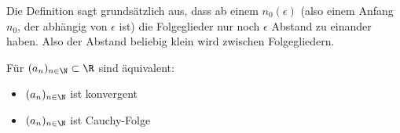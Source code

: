 Die Definition sagt grundsätzlich aus, dass ab einem $n_0(\epsilon)$ (also einem Anfang $n_0$, der abhängig von $\epsilon$ ist)
die Folgeglieder nur noch $\epsilon$ Abstand zu einander haben. Also der Abstand beliebig klein wird zwischen Folgegliedern.

\begin{satz}
Für $(a_n)_{n \in \N} \subset \R$ sind äquivalent:
\begin{itemize}
	\item $(a_n)_{n \in \N}$ ist konvergent
	\item $(a_n)_{n \in \N}$ ist Cauchy-Folge
\end{itemize}
\end{satz}
